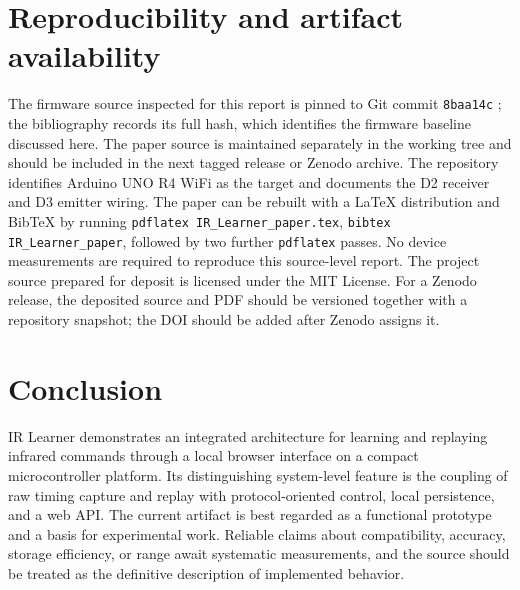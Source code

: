 \documentclass[11pt]{article}
\begin{document}
\section{Reproducibility and artifact availability}
The firmware source inspected for this report is pinned to Git commit \texttt{8baa14c} \citep{irLearnerRepo}; the bibliography records its full hash, which identifies the firmware baseline discussed here. The paper source is maintained separately in the working tree and should be included in the next tagged release or Zenodo archive. The repository identifies Arduino UNO R4 WiFi as the target and documents the D2 receiver and D3 emitter wiring. The paper can be rebuilt with a LaTeX distribution and BibTeX by running \texttt{pdflatex IR\_Learner\_paper.tex}, \texttt{bibtex IR\_Learner\_paper}, followed by two further \texttt{pdflatex} passes. No device measurements are required to reproduce this source-level report. The project source prepared for deposit is licensed under the MIT License. For a Zenodo release, the deposited source and PDF should be versioned together with a repository snapshot; the DOI should be added after Zenodo assigns it.

\section{Conclusion}
IR Learner demonstrates an integrated architecture for learning and replaying infrared commands through a local browser interface on a compact microcontroller platform. Its distinguishing system-level feature is the coupling of raw timing capture and replay with protocol-oriented control, local persistence, and a web API. The current artifact is best regarded as a functional prototype and a basis for experimental work. Reliable claims about compatibility, accuracy, storage efficiency, or range await systematic measurements, and the source should be treated as the definitive description of implemented behavior.



\end{document}
